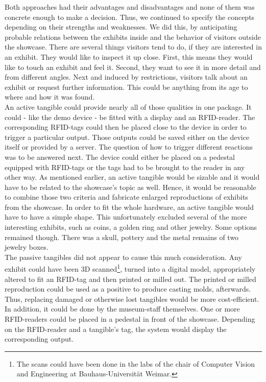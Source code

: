 Both approaches had their advantages and disadvantages and none of them was concrete enough to make a decision. Thus, we continued to specify the concepts depending on their strengths and weaknesses. We did this, by anticipating probable relations between the exhibits inside and the behavior of visitors outside the showcase. There are several things visitors tend to do, if they are interested in an exhibit. They would like to inspect it up close. First, this means they would like to touch an exhibit and feel it. Second, they want to see it in more detail and from different angles. Next and induced by restrictions, visitors talk about an exhibit or  request further information. This could be anything from its age to where and how it was found.
\\
An active tangible could provide nearly all of those qualities in one package. It could - like the demo device - be fitted with a display and an \ac{RFID}-reader. The corresponding \ac{RFID}-tags could then be placed close to the device in order to trigger a particular output. Those outputs could be saved either on the device itself or provided by a server. The question of how to trigger different reactions was to be answered next. The device could either be placed on a pedestal equipped with \ac{RFID}-tags or the tags had to be brought to the reader in any other way. As mentioned earlier, an active tangible would be sizable and it would have to be related to the showcase's topic as well. Hence, it would be reasonable to combine those two criteria and fabricate enlarged reproductions of exhibits from the showcase. In order to fit the whole hardware, an active tangible would have to have a simple shape. This unfortunately excluded several of the more interesting exhibits, such as coins, a golden ring and other jewelry. Some options remained though. There was a skull, pottery and the metal remains of two jewelry boxes.
\\
The passive tangibles did not appear to cause this much consideration. Any exhibit could have been \ac{3D} scanned\footnote{The scans could have been done in the labs of the chair of Computer Vision and Engineering at Bauhaus-Universität Weimar.}, turned into a digital model, appropriately altered to fit an \ac{RFID}-tag and then printed or milled out. The printed or milled reproduction could be used as a positive to produce casting molds, afterwards. Thus, replacing damaged or otherwise lost tangibles would be more cost-efficient. In addition, it could be done by the museum-staff themselves. One or more \ac{RFID}-readers could be placed in a pedestal in front of the showcase. Depending on the \ac{RFID}-reader and a tangible's tag, the system would display the corresponding output.
